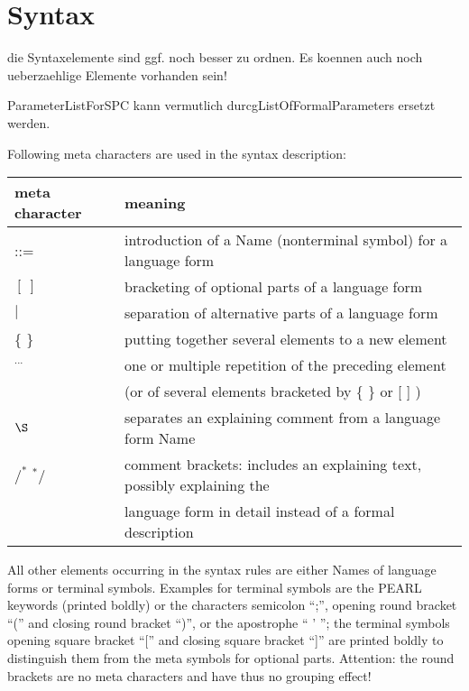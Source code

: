 \section{Syntax}    %
\begin{discuss}
die Syntaxelemente sind ggf. noch besser zu ordnen.
Es koennen auch noch ueberzaehlige Elemente vorhanden sein!

ParameterListForSPC kann vermutlich durcgListOfFormalParameters ersetzt 
werden.


\end{discuss}

Following meta characters are used in the syntax description:\\ 

\begin{tabular}{ll}
meta character & meaning \\ \hline
::=            & introduction of a Name (nonterminal symbol) for a language form\\
$[\ ]$         & bracketing of optional parts of a language form \\ 
$\mid$         & separation of alternative parts of a language form\\
\{ \}          & putting together several elements to a new element\\
$^{...}$       & one or multiple repetition of the preceding element\\
               & (or of several elements bracketed by \{ \} or [ ] ) \\
$\S $          & separates an explaining comment from a language form Name\\
$/^*$ $^*/$    & comment brackets: 
                 includes an explaining text, possibly explaining the\\
               & language form in detail instead of a formal description\\
\end{tabular}

All other elements occurring in the syntax rules are either Names of language
forms or terminal symbols. Examples for terminal symbols are the PEARL
keywords (printed boldly) or the characters semicolon ``;'', opening round
bracket ``('' and closing round bracket ``)'', 
or the apostrophe `` ' ''; the terminal symbols opening square bracket ``[''
and closing square bracket ``]'' are printed boldly to distinguish them
from the meta symbols for optional parts. Attention: the round brackets are
no meta characters and have thus no grouping effect!\\

